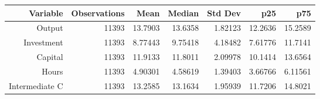 \begin{tabular}{|r|r|r|r|r|r|r|}
  \hline
  \textbf{Variable} & \textbf{Observations} & \textbf{Mean} & \textbf{Median} & \textbf{Std Dev} & \textbf{p25} & \textbf{p75} \\\hline
  Output & 11393 & 13.7903 & 13.6358 & 1.82123 & 12.2636 & 15.2589 \\
  Investment & 11393 & 8.77443 & 9.75418 & 4.18482 & 7.61776 & 11.7141 \\
  Capital & 11393 & 11.9133 & 11.8011 & 2.09978 & 10.1414 & 13.6564 \\
  Hours & 11393 & 4.90301 & 4.58619 & 1.39403 & 3.66766 & 6.11561 \\
  Intermediate C & 11393 & 13.2585 & 13.1634 & 1.95939 & 11.7206 & 14.8021 \\\hline
\end{tabular}
